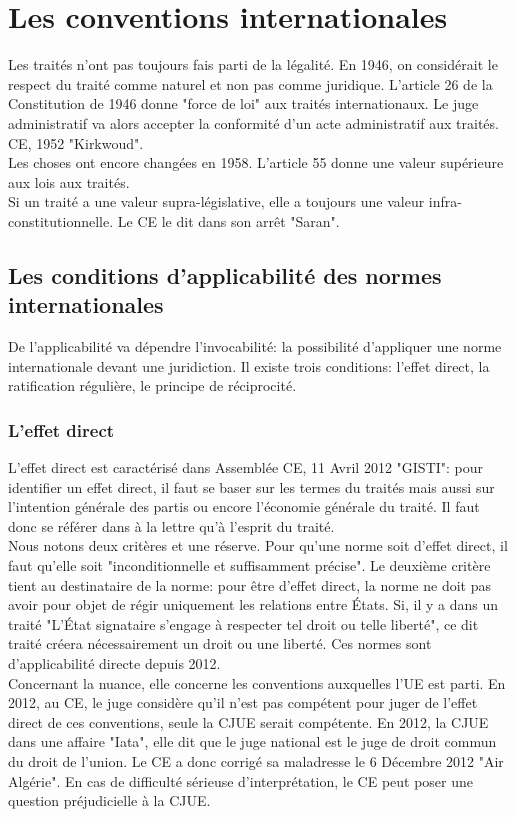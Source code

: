 \documentclass[10pt, a4paper, openany]{book}
\begin{document}
\chapter{Les conventions internationales}

Les traités n'ont pas toujours fais parti de la légalité. En 1946, on considérait le respect du traité comme naturel et non pas comme juridique. L'article 26 de la Constitution de 1946 donne "force de loi" aux traités internationaux. Le juge administratif va alors accepter la conformité d'un acte administratif aux traités. CE, 1952 "Kirkwoud". \\
Les choses ont encore changées en 1958. L'article 55 donne une valeur supérieure aux lois aux traités. \\
Si un traité a une valeur supra-législative, elle a toujours une valeur infra-constitutionnelle. Le CE le dit dans son arrêt "Saran". 

\section{Les conditions d'applicabilité des normes internationales}

De l'applicabilité va dépendre l'invocabilité: la possibilité d'appliquer une norme internationale devant une juridiction. Il existe trois conditions: l'effet direct, la ratification régulière, le principe de réciprocité.

\subsection{L'effet direct}

L'effet direct est caractérisé dans Assemblée CE, 11 Avril 2012 "GISTI": pour identifier un effet direct, il faut se baser sur les termes du traités mais aussi sur l'intention générale des partis ou encore l'économie générale du traité. Il faut donc se référer dans à la lettre qu'à l'esprit du traité. \\
Nous notons deux critères et une réserve. Pour qu'une norme soit d'effet direct, il faut qu'elle soit "inconditionnelle et suffisamment précise". Le deuxième critère tient au destinataire de la norme: pour être d'effet direct, la norme ne doit pas avoir pour objet de régir uniquement les relations entre États. Si, il y a dans un traité "L'État signataire s'engage à respecter tel droit ou telle liberté", ce dit traité créera nécessairement un droit ou une liberté. Ces normes sont d'applicabilité directe depuis 2012. \\
Concernant la nuance, elle concerne les conventions auxquelles l'UE est parti. En 2012, au CE, le juge considère qu'il n'est pas compétent pour juger de l'effet direct de ces conventions, seule la CJUE serait compétente. En 2012, la CJUE dans une affaire "Iata", elle dit que le juge national est le juge de droit commun du droit de l'union. Le CE a donc corrigé sa maladresse le 6 Décembre 2012 "Air Algérie". En cas de difficulté sérieuse d'interprétation, le CE peut poser une question préjudicielle à la CJUE.
\end{document}
